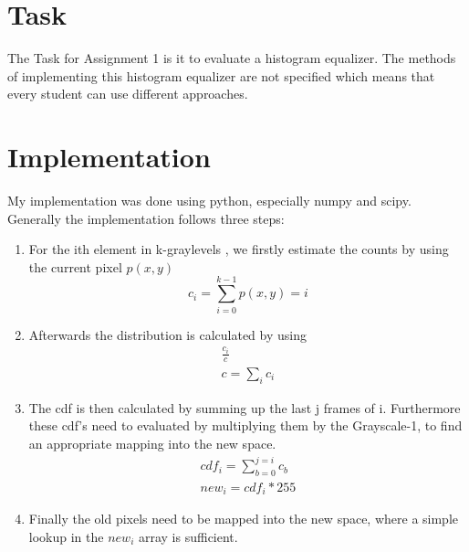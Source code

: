 
\section{Task}
\label{sec:intro}
The Task for Assignment 1 is it to evaluate a histogram equalizer. The methods of implementing this histogram equalizer are not specified which means that every student can use different approaches.

\section{Implementation}

My implementation was done using python, especially numpy and scipy. Generally the implementation follows three steps:

\begin{enumerate}
\item For the ith element in k-graylevels , we firstly estimate the counts by using the current pixel $p(x,y)$ \begin{equation}
c_i = \sum\limits_{i=0}^{k-1} p(x,y) = i
\end{equation}

\item Afterwards the distribution is calculated by using \begin{align}
\frac{c_i}{c} \\
c = \sum\limits_i c_i
\end{align}

\item The cdf is then calculated by summing up the last j frames of i. Furthermore these cdf's need to evaluated by multiplying them by the Grayscale-1, to find an appropriate mapping into the new space.
\begin{align}
cdf_i = \sum\limits_{b=0}^{j=i} c_b \\
new_i = cdf_i * 255
\end{align}

\item Finally the old pixels need to be mapped into the new space, where a simple lookup in the $new_i$ array is sufficient.

\end{enumerate}


